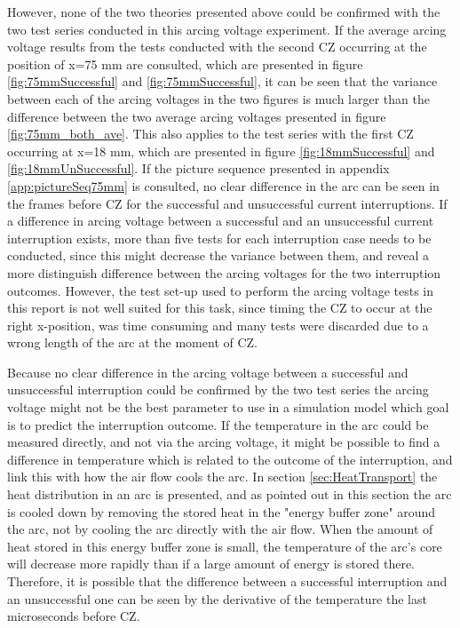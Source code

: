 \documentclass[10pt,b5paper,twoside]{article}
\begin{document}
However, none of the two theories presented above could be confirmed with the two test series conducted in this arcing voltage experiment. If the average arcing voltage results from the tests conducted with the second CZ occurring at the position of x=75 mm are consulted, which are presented in figure \ref{fig:75mmSuccessful} and \ref{fig:75mmSuccessful}, it can be seen that the variance between each of the arcing voltages in the two figures is much larger than the difference between the two average arcing voltages presented in figure \ref{fig:75mm_both_ave}. This also applies to the test series with the first CZ occurring at x=18 mm, which are presented in figure \ref{fig:18mmSuccessful} and \ref{fig:18mmUnSuccessful}. If the picture sequence presented in appendix \ref{app:pictureSeq75mm} is consulted, no clear difference in the arc can be seen in the frames before CZ for the successful and unsuccessful current interruptions. If a difference in arcing voltage between a successful and an unsuccessful current interruption exists, more than five tests for each interruption case needs to be conducted, since this might decrease the variance between them, and reveal a more distinguish difference between the arcing voltages for the two interruption outcomes. However, the test set-up used to perform the arcing voltage tests in this report is not well suited for this task, since timing the CZ to occur at the right x-position, was time consuming and many tests were discarded due to a wrong length of the arc at the moment of CZ.

Because no clear difference in the arcing voltage between a successful and unsuccessful interruption could be confirmed by the two test series the arcing voltage might not be the best parameter to use in a simulation model which goal is to predict the interruption outcome. If the temperature in the arc could be measured directly, and not via the arcing voltage, it might be possible to find a difference in temperature which is related to the outcome of the interruption, and link this with how the air flow cools the arc. In section \ref{sec:HeatTransport} the heat distribution in an arc is presented, and as pointed out in this section the arc is cooled down by removing the stored heat in the "energy buffer zone" around the arc, not by cooling the arc directly with the air flow. When the amount of heat stored in this energy buffer zone is small, the temperature of the arc's core will decrease more rapidly than if a large amount of energy is stored there. Therefore, it is possible that the difference between a successful interruption and an unsuccessful one can be seen by the derivative of the temperature the last microseconds before CZ.
\end{document}
